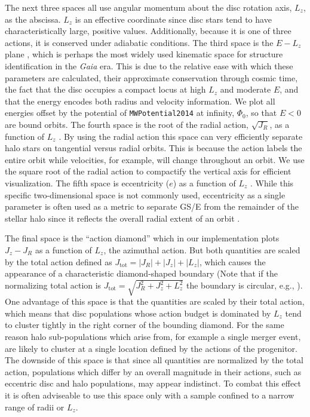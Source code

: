 The next three spaces all use angular momentum about the disc rotation axis, $L_{z}$, as the abscissa. $L_{z}$ is an effective coordinate since disc stars tend to have characteristically large, positive values. Additionally, because it is one of three actions, it is conserved under adiabatic conditions. The third space is the $E-L_{z}$ plane \parencite[e.g. ][]{helmi18,koppelman19b, naidu20,feuillet20,cordoni20,horta21a}, which is perhaps the most widely used kinematic space for structure identification in the \textit{Gaia} era. This is due to the relative ease with which these parameters are calculated, their approximate conservation through cosmic time, the fact that the disc occupies a compact locus at high $L_{z}$ and moderate $E$, and that the energy encodes both radius and velocity information. We plot all energies offset by the potential of \texttt{MWPotential2014} at infinity, $\Phi_{0}$, so that $E<0$ are bound orbits. The fourth space is the root of the radial action, $\sqrt{J_{R}}$, as a function of $L_{z}$ \parencite[e.g.][]{trick19,feuillet20,matsuno21,horta21a}. By using the radial action this space can very efficiently separate halo stars on tangential versus radial orbits. This is because the action labels the entire orbit while velocities, for example, will change throughout an orbit. We use the square root of the radial action to compactify the vertical axis for efficient visualization. The fifth space is eccentricity ($e$) as a function of $L_{z}$ \parencite[e.g.][]{cordoni20}. While this specific two-dimensional space is not commonly used, eccentricity as a single parameter is often used as a metric to separate GS/E from the remainder of the stellar halo since it reflects the overall radial extent of an orbit \parencite[e.g.][]{belokurov18,mackereth20,naidu20}.

The final space is the ``action diamond'' \parencite[e.g. ][]{vasiliev19,myeong19,monty20,cordoni20,naidu20} which in our implementation plots $J_{z}-J_{R}$ as a function of $L_{z}$, the azimuthal action. But both quantities are scaled by the total action defined as $J_\mathrm{tot}=\lvert J_{R} \rvert + \lvert J_{z} \rvert + \lvert L_{z} \rvert$, which causes the appearance of a characteristic diamond-shaped boundary (Note that if the normalizing total action is $J_\mathrm{tot}= \sqrt{ J_{R}^{2} + J_{z}^{2} + L_{z}^{2}}$ the boundary is circular, e.g., \textcite{naidu20}). One advantage of this space is that the quantities are scaled by their total action, which means that disc populations whose action budget is dominated by $L_{z}$ tend to cluster tightly in the right corner of the bounding diamond. For the same reason halo sub-populations which arise from, for example a single merger event, are likely to cluster at a single location defined by the actions of the progenitor. The downside of this space is that since all quantities are normalized by the total action, populations which differ by an overall magnitude in their actions, such as eccentric disc and halo populations, may appear indistinct. To combat this effect it is often adviseable to use this space only with a sample confined to a narrow range of radii or $L_{z}$.

